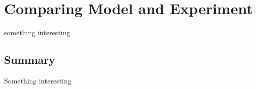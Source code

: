 %
\chapter{Comparing Model and Experiment}
\label{chap:2_ModelAndExperiment}

\begin{learningObjectives}
\item something interesting
\end{learningObjectives}


\newpage
\section{Summary}
\vspace{2cm}
\begin{chapterSummary}
\item Something interesting
\end{chapterSummary}